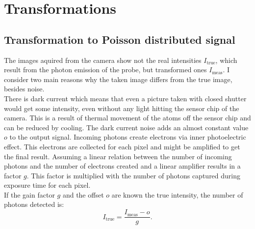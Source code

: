 \section{Transformations}
\subsection{Transformation to Poisson distributed signal} \label{trafoPoiss}
The images aquired from the camera show not the real intensities
$I_\text{true}$, which result from the photon emission of the probe, but
transformed ones $I_\text{meas}$. I consider two main reasons why the taken image
differs from the true image, besides noise.\\
There is dark current which means that even a picture taken with closed shutter
would get some intensity, even without any light hitting the sensor chip of the
camera. This is a result of thermal movement of the atoms off the sensor chip
and can be reduced by cooling. The dark current noise adds an almost constant
value $o$ to the output signal.
Incoming photons create electrons via inner photoelectric effect. This electrons
are collected for each pixel and might be amplified to get the final result.
Assuming a linear relation between the number of incoming photons and the number
of electrons created and a linear amplifier results in a factor $g$. This factor
is multiplied with the number of photons captured during exposure time for each
pixel.\\
If the gain factor $g$ and the offset $o$ are known the true intensity, the
number of photons detected is:
\begin{equation}
	I_\text{true} = \dfrac{I_\text{meas}-o}{g}. \label{transtopoiss}
\end{equation}
